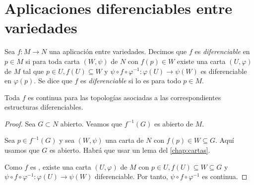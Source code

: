 \documentclass[../VD.tex]{subfiles}
\begin{document}
\setcounter{chapter}{1}
\chapter{Aplicaciones diferenciables entre variedades}
\label{chap:app}

\begin{definition}[diferenciable]
  \label{def:diferenciable}
  Sea \(f \colon M \to N\) una aplicación entre variedades. Decimos que \(f\) es
  \emph{diferenciable} en \(p \in M\) si para toda carta \((W,\psi)\) de \(N\) con \(f(p)
  \in W\) existe una carta \((U,\varphi)\) de \(M\) tal que \(p \in U, f(U)
  \subseteq W\) y \(\psi \circ f \circ \varphi^{-1} \colon \varphi(U) \to
  \psi(W)\) es diferenciable en \(\varphi(p)\). Se dice que \(f\) es \emph{diferenciable}
  si lo es para todo \(p \in M\).
\end{definition}

\begin{lemma}
  Toda \(f\)  es continua para las topologías
  asociadas a las correspondientes estructuras diferenciables.
\end{lemma}

\begin{proof}
  Sea \(G \subset N\) abierto. Veamos que \(f^{-1}(G)\) es abierto de \(M\).

  Sea \(p \in f^{-1}(G)\) y sea \((W,\psi)\) una carta de \(N\) con \(f(p) \in W
  \subseteq G\). Aquí usamos que \(G\) es abierto. Habrá que usar un lema del
  \cref{chap:cartas}.

  Como \(f\) es , existe una carta \((U,\varphi)\) de
  \(M\) con \(p \in U, f(U) \subseteq W \subseteq G\) y \(\psi \circ f \circ
  \varphi^{-1} \colon \varphi(U) \to \psi(W)\) diferenciable.
  Por tanto, \(\psi \circ f \circ \varphi^{-1}\) es continua. 
\end{proof}
\end{document}
